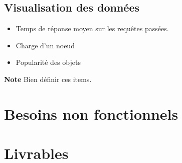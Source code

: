 \documentclass[12pt]{article}
\begin{document}

\subsection{Visualisation des données}

\begin{itemize}
 \item Temps de réponse moyen sur les requêtes passées.
 \item Charge d'un noeud
 \item Popularité des objets
\end{itemize}


\textbf{Note } Bien définir ces items. \newline


\newpage

\section{Besoins non fonctionnels}




\newpage

\section{Livrables}
\end{document}
